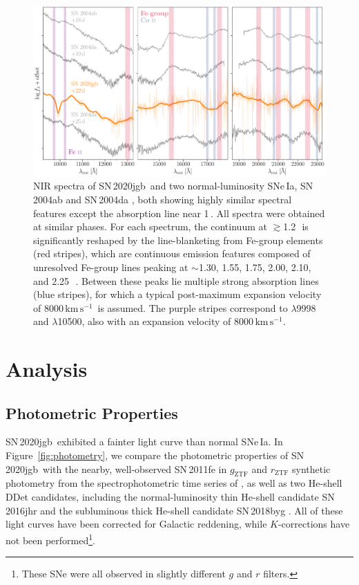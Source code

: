 \documentclass[twocolumn]{aastex631}
\newcommand{\sn}{SN\,2020jgb}
\newcommand{\kms}{$\mathrm{km}\,\mathrm{s}^{-1}$}
\begin{document}
\begin{CJK*}{UTF8}{gbsn}
\begin{figure}
    \centering
    \includegraphics[width=\textwidth]{NIR_spec.pdf}
    \caption{NIR spectra of \sn\ and two normal-luminosity SNe\,Ia, SN\,2004ab and SN\,2004da \citep{Marion2009_NIR}, both showing highly similar spectral features except the absorption line near 1\,\micron. All spectra were obtained at similar phases. For each spectrum, the continuum at $\gtrsim$1.2\,\micron\ is significantly reshaped by the line-blanketing from Fe-group elements (red stripes), which are continuous emission features composed of unresolved Fe-group lines peaking at $\sim$1.30, 1.55, 1.75, 2.00, 2.10, and 2.25\,\micron\ \citep{Marion2009_NIR}. Between these peaks lie multiple strong  absorption lines (blue stripes), for which a typical post-maximum expansion velocity of 8000\,\kms\ is assumed. The purple stripes correspond to  $\lambda$9998 and  $\lambda$10500, also with an expansion velocity of 8000\,\kms.}
    \label{fig:NIR_spec}
\end{figure}

\section{Analysis} \label{sec:analysis}
\subsection{Photometric Properties}
\sn\ exhibited a fainter light curve than normal SNe\,Ia. In Figure~\ref{fig:photometry}, we compare the photometric properties of \sn\ with the nearby, well-observed SN\,2011fe in $g_\mathrm{ZTF}$ and $r_\mathrm{ZTF}$ synthetic photometry from the spectrophotometric time series of \citet{Pereira_2013}, as well as two He-shell DDet candidates, including the normal-luminosity thin He-shell candidate SN\,2016jhr \citep{jiang_16jhr_2017} and the subluminous thick He-shell candidate SN\,2018byg \citep{de_18byg_2019}. All of these light curves have been corrected for Galactic reddening, while $K$-corrections have not been performed\footnote{These SNe were all observed in slightly different $g$ and $r$ filters.}.


\end{CJK*}
\end{document}
